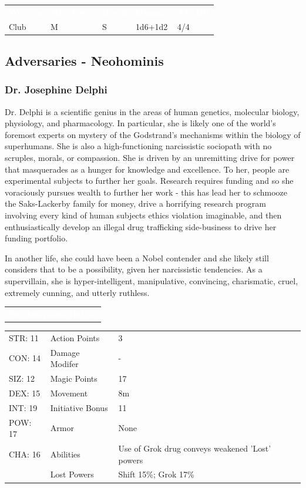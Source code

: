 \documentclass[letterpaper,serif]{rpg-module}
\begin{document}
\begin{tabularx}{\linewidth}{XXXXX}
\rowcolor{gray}
\textcolor{white}{\textbf{Weapon}} & \textcolor{white}{\textbf{Size/Force}} & \textcolor{white}{\textbf{Reach}} & \textcolor{white}{\textbf{Damage}} & \textcolor{white}{\textbf{AP/HP}} \\
Club & M & S & 1d6+1d2 & 4/4
\end{tabularx}

\subsection{Adversaries - Neohominis}

\subsubsection{Dr. Josephine  Delphi}

Dr. Delphi is a scientific genius in the areas of human genetics, molecular biology, physiology, and pharmacology. In particular, she is likely one of the world's foremost experts on mystery of the Godstrand's mechanisms within the biology of superhumans. She is also a high-functioning narcissistic sociopath with no scruples, morals, or compassion. She is driven by an unremitting drive for power that masquerades as a hunger for knowledge and excellence. To her, people are experimental subjects to further her goals. Research requires funding and so she voraciously pursues wealth to further her work - this has lead her to schmooze the Saks-Lackerby family for money, drive a horrifying research program involving every kind of human subjects ethics violation imaginable, and then enthusiastically develop an illegal drug trafficking side-business to drive her funding portfolio. 

In another life, she could have been a Nobel contender and she likely still considers that to be a possibility, given her narcissistic tendencies. As a supervillain, she is hyper-intelligent, manipulative, convincing, charismatic, cruel, extremely cunning, and utterly ruthless. 

\vspace{12pt}

\noindent\begin{tabularx}{\linewidth}{X}
\rowcolor{gray}
\textcolor{white}{\textbf{Dr. Josephine  Delphi}}
\end{tabularx}

\begin{tabularx}{\linewidth}{XXX}
STR: 11 & Action Points & 3 \\
CON: 14 & Damage Modifer & - \\
SIZ: 12 & Magic Points & 17 \\
DEX: 15 & Movement & 8m \\
INT: 19 & Initiative Bonus & 11 \\
POW: 17 & Armor & None \\
CHA: 16 & Abilities & Use of Grok drug conveys weakened 'Lost' powers  \\
    & Lost Powers & Shift 15\%; Grok 17\%
\end{tabularx}
\end{document}
